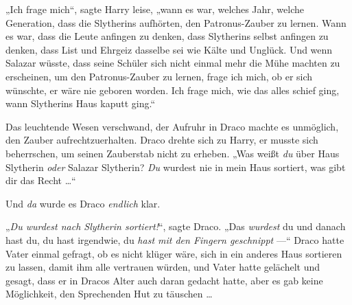 „Ich frage mich“, sagte Harry leise, „wann es war, welches Jahr, welche Generation, dass die Slytherins aufhörten, den Patronus-Zauber zu lernen. Wann es war, dass die Leute anfingen zu denken, dass Slytherins selbst anfingen zu denken, dass List und Ehrgeiz dasselbe sei wie Kälte und Unglück. Und wenn Salazar wüsste, dass seine Schüler sich nicht einmal mehr die Mühe machten zu erscheinen, um den Patronus-Zauber zu lernen, frage ich mich, ob er sich wünschte, er wäre nie geboren worden. Ich frage mich, wie das alles schief ging, wann Slytherins Haus kaputt ging.“

Das leuchtende Wesen verschwand, der Aufruhr in Draco machte es unmöglich, den Zauber aufrechtzuerhalten. Draco drehte sich zu Harry, er musste sich beherrschen, um seinen Zauberstab nicht zu erheben.
„Was weißt \emph{du} über Haus Slytherin \emph{oder} Salazar Slytherin? \emph{Du} wurdest nie in mein Haus sortiert, was gibt dir das Recht …“

Und \emph{da} wurde es Draco \emph{endlich} klar.

„\emph{Du wurdest nach Slytherin sortiert!}“, sagte Draco.
„Das \emph{wurdest} du und danach hast du, du hast irgendwie, du \emph{hast mit den Fingern geschnippt} —“ Draco hatte Vater einmal gefragt, ob es nicht klüger wäre, sich in ein anderes Haus sortieren zu lassen, damit ihm alle vertrauen würden, und Vater hatte gelächelt und gesagt, dass er in Dracos Alter auch daran gedacht hatte, aber es gab keine Möglichkeit, den Sprechenden Hut zu täuschen …


